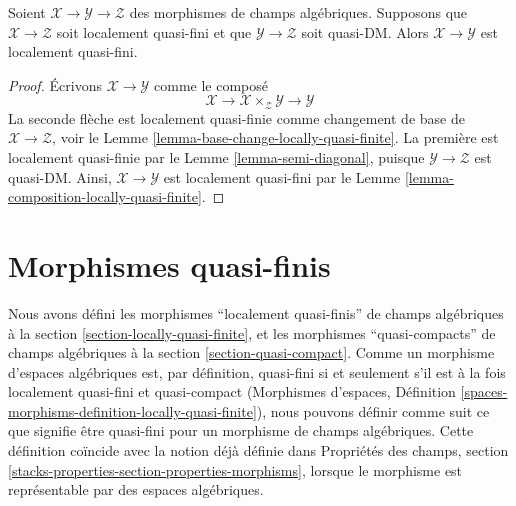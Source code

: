 \begin{lemma}
\label{lemma-locally-quasi-finite-permanence}
Soient $\mathcal{X} \to \mathcal{Y} \to \mathcal{Z}$ des morphismes de
champs algébriques. Supposons que $\mathcal{X} \to \mathcal{Z}$ soit
localement quasi-fini et que $\mathcal{Y} \to \mathcal{Z}$ soit quasi-DM.
Alors $\mathcal{X} \to \mathcal{Y}$ est localement quasi-fini.
\end{lemma}

\begin{proof}
Écrivons $\mathcal{X} \to \mathcal{Y}$ comme le composé
$$
\mathcal{X} \longrightarrow
\mathcal{X} \times_\mathcal{Z} \mathcal{Y} \longrightarrow
\mathcal{Y}
$$
La seconde flèche est localement quasi-finie comme changement de base de
$\mathcal{X} \to \mathcal{Z}$, voir le
Lemme \ref{lemma-base-change-locally-quasi-finite}.
La première est localement quasi-finie par le
Lemme \ref{lemma-semi-diagonal}, puisque
$\mathcal{Y} \to \mathcal{Z}$ est quasi-DM.
Ainsi, $\mathcal{X} \to \mathcal{Y}$ est localement quasi-fini par le
Lemme \ref{lemma-composition-locally-quasi-finite}.
\end{proof}

















\section{Morphismes quasi-finis}
\label{section-quasi-finite}

\noindent
Nous avons défini les morphismes ``localement quasi-finis'' de champs
algébriques à la section \ref{section-locally-quasi-finite}, et les morphismes
``quasi-compacts'' de champs algébriques à la
section \ref{section-quasi-compact}. Comme un morphisme d'espaces algébriques
est, par définition, quasi-fini si et seulement s'il est à la fois localement
quasi-fini et quasi-compact (Morphismes d'espaces, Définition
\ref{spaces-morphisms-definition-locally-quasi-finite}),
nous pouvons définir comme suit ce que signifie être quasi-fini pour un
morphisme de champs algébriques. Cette définition coïncide avec la notion déjà
définie dans Propriétés des champs,
section \ref{stacks-properties-section-properties-morphisms}, lorsque le
morphisme est représentable par des espaces algébriques.

